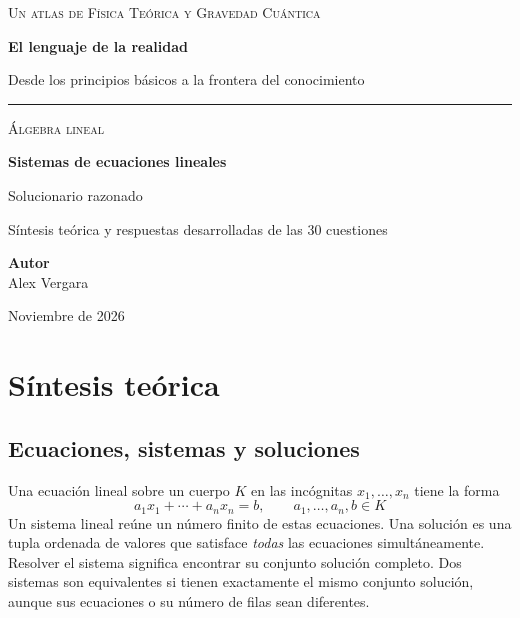 \documentclass[11pt,a4paper]{article}
\begin{document}
\begin{titlepage}
\thispagestyle{empty}
\vspace*{22mm}
{\color{ink}\Large\scshape Un atlas de Física Teórica y Gravedad Cuántica\par}
\vspace{12mm}
{\Huge\bfseries El lenguaje de la realidad\par}
\vspace{5mm}
{\large Desde los principios básicos a la frontera del conocimiento\par}
\vspace{26mm}
{\color{rulegray}\rule{\textwidth}{1pt}\par}
\vspace{9mm}
{\large\scshape Álgebra lineal\par}
\vspace{5mm}
{\LARGE\bfseries Sistemas de ecuaciones lineales\par}
\vspace{5mm}
{\Large Solucionario razonado\par}
\vspace{6mm}
{\normalsize Síntesis teórica y respuestas desarrolladas de las 30 cuestiones\par}
\vfill
{\large\textbf{Autor}\\ Alex Vergara\par}
\vspace{8mm}
{\small Noviembre de 2026\par}
\end{titlepage}
\tableofcontents
\clearpage

\section{Síntesis teórica}
\subsection{Ecuaciones, sistemas y soluciones}
Una ecuación lineal sobre un cuerpo $K$ en las incógnitas $x_1,\ldots,x_n$ tiene la forma
\[
a_1x_1+\cdots+a_nx_n=b,\qquad a_1,\ldots,a_n,b\in K
\]
Un sistema lineal reúne un número finito de estas ecuaciones. Una solución es una tupla ordenada de valores que satisface \emph{todas} las ecuaciones simultáneamente. Resolver el sistema significa encontrar su conjunto solución completo. Dos sistemas son equivalentes si tienen exactamente el mismo conjunto solución, aunque sus ecuaciones o su número de filas sean diferentes.
\end{document}
